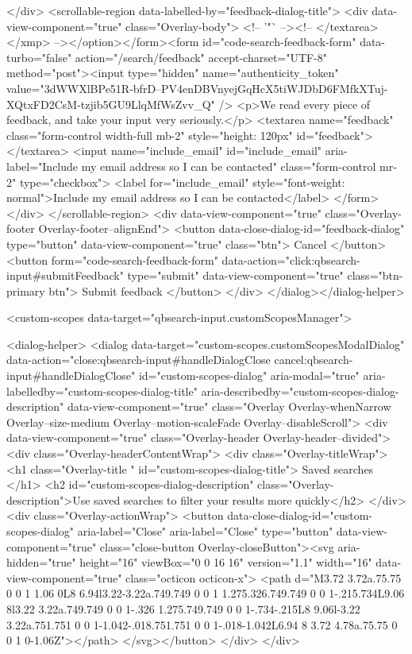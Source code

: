 {{</div>
      <scrollable-region data-labelled-by="feedback-dialog-title">
        <div data-view-component="true" class="Overlay-body">        <!-- '"` --><!-- </textarea></xmp> --></option></form><form id="code-search-feedback-form" data-turbo="false" action="/search/feedback" accept-charset="UTF-8" method="post"><input type="hidden" name="authenticity_token" value="3dWWXlBPe51R-bfrD--PV4enDBVnyejGqHcX5tiWJDbD6FMfkXTuj-XQtxFD2CsM-tzjib5GU9LlqMfWsZvv_Q" />
          <p>We read every piece of feedback, and take your input very seriously.</p>
          <textarea name="feedback" class="form-control width-full mb-2" style="height: 120px" id="feedback"></textarea>
          <input name="include_email" id="include_email" aria-label="Include my email address so I can be contacted" class="form-control mr-2" type="checkbox">
          <label for="include_email" style="font-weight: normal">Include my email address so I can be contacted</label>
</form></div>
      </scrollable-region>
      <div data-view-component="true" class="Overlay-footer Overlay-footer--alignEnd">          <button data-close-dialog-id="feedback-dialog" type="button" data-view-component="true" class="btn">    Cancel
</button>
          <button form="code-search-feedback-form" data-action="click:qbsearch-input#submitFeedback" type="submit" data-view-component="true" class="btn-primary btn">    Submit feedback
</button>
</div>
</dialog></dialog-helper>

    <custom-scopes data-target="qbsearch-input.customScopesManager">
    
<dialog-helper>
  <dialog data-target="custom-scopes.customScopesModalDialog" data-action="close:qbsearch-input#handleDialogClose cancel:qbsearch-input#handleDialogClose" id="custom-scopes-dialog" aria-modal="true" aria-labelledby="custom-scopes-dialog-title" aria-describedby="custom-scopes-dialog-description" data-view-component="true" class="Overlay Overlay-whenNarrow Overlay--size-medium Overlay--motion-scaleFade Overlay--disableScroll">
    <div data-view-component="true" class="Overlay-header Overlay-header--divided">
  <div class="Overlay-headerContentWrap">
    <div class="Overlay-titleWrap">
      <h1 class="Overlay-title " id="custom-scopes-dialog-title">
        Saved searches
      </h1>
        <h2 id="custom-scopes-dialog-description" class="Overlay-description">Use saved searches to filter your results more quickly</h2>
    </div>
    <div class="Overlay-actionWrap">
      <button data-close-dialog-id="custom-scopes-dialog" aria-label="Close" aria-label="Close" type="button" data-view-component="true" class="close-button Overlay-closeButton"><svg aria-hidden="true" height="16" viewBox="0 0 16 16" version="1.1" width="16" data-view-component="true" class="octicon octicon-x">
    <path d="M3.72 3.72a.75.75 0 0 1 1.06 0L8 6.94l3.22-3.22a.749.749 0 0 1 1.275.326.749.749 0 0 1-.215.734L9.06 8l3.22 3.22a.749.749 0 0 1-.326 1.275.749.749 0 0 1-.734-.215L8 9.06l-3.22 3.22a.751.751 0 0 1-1.042-.018.751.751 0 0 1-.018-1.042L6.94 8 3.72 4.78a.75.75 0 0 1 0-1.06Z"></path>
</svg></button>
    </div>
  </div>
  
}}
